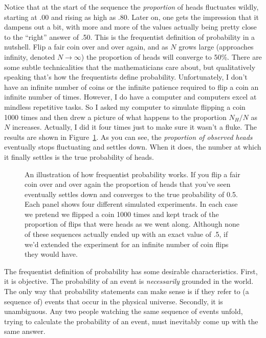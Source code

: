 Notice that at the start of the sequence the {\it proportion} of heads fluctuates wildly, starting at .00 and rising as high as .80. Later on, one gets the impression that it dampens out a bit, with more and more of the values actually being pretty close to the ``right'' answer of .50. This is the frequentist definition of probability in a nutshell. Flip a fair coin over and over again, and as $N$ grows large (approaches infinity, denoted $N\rightarrow \infty$) the proportion of heads will converge to 50\%. There are some subtle technicalities that the mathematicians care about, but qualitatively speaking that's how the frequentists define probability. Unfortunately, I don't have an infinite number of coins or the infinite patience required to flip a coin an infinite number of times. However, I do have a computer and computers excel at mindless repetitive tasks. So I asked my computer to simulate flipping a coin 1000 times and then drew a picture of what happens to the proportion $N_H / N$ as $N$ increases. Actually, I did it four times just to make sure it wasn't a fluke. The results are shown in Figure~\ref{fig:frequentistprobability}. As you can see, the {\it proportion of observed heads} eventually stops fluctuating and settles down. When it does, the number at which it finally settles is the true probability of heads.

\begin{figure}[p]
\begin{center}
\caption{An illustration of how frequentist probability works. If you flip a fair coin over and over again the proportion of heads that you've seen eventually settles down and converges to the true probability of 0.5. Each panel shows four different simulated experiments. In each case we pretend we flipped a coin 1000 times and kept track of the proportion of flips that were heads as we went along. Although none of these sequences actually ended up with an exact value of .5, if we'd extended the experiment for an infinite number of coin flips they would have.}
\label{fig:frequentistprobability}
\end{center}
\end{figure}

The frequentist definition of probability has some desirable characteristics. First, it is objective. The probability of an event is {\it necessarily} grounded in the world. The only way that probability statements can make sense is if they refer to (a sequence of) events that occur in the physical universe. Secondly, it is unambiguous. Any two people watching the same sequence of events unfold, trying to calculate the probability of an event, must inevitably come up with the same answer. 

